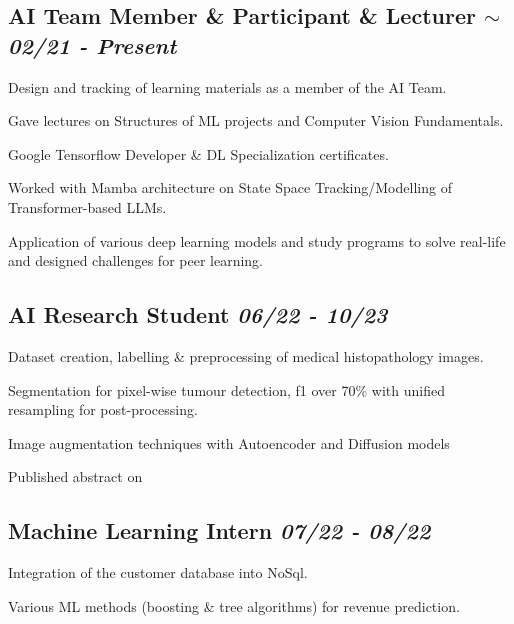\documentclass[letter, 14pt]{article}
\begin{document}
\subsection{AI Team Member \& Participant \& Lecturer \hfill\textit{\textmd{{\tiny$\sim$} 02/21 - Present}}}
\begin{zitemize}
\item Design and tracking of learning materials as a member of the AI Team.
\item Gave lectures on Structures of ML projects and Computer Vision Fundamentals.
\item Google Tensorflow Developer \& DL Specialization certificates.
\item Worked with Mamba architecture on State Space Tracking/Modelling of Transformer-based LLMs.
\item Application of various deep learning models and study programs to solve real-life and designed challenges for peer learning.
\end{zitemize}


\subsection{AI Research Student \hfill \textit{\textmd{ 06/22 - 10/23}}}
\begin{zitemize}
\item Dataset creation, labelling \& preprocessing of medical histopathology images.
\item Segmentation for pixel-wise tumour detection, f1 over 70\% with unified resampling for post-processing.
\item Image augmentation techniques with Autoencoder and Diffusion models
\item Published abstract on 
\href{https://arxiv.org/abs/2504.05219}{\color{black}{arxiv. \externallink}}
\end{zitemize}


\subsection{Machine Learning Intern \hfill \textit{\textmd{ 07/22 - 08/22}}}
\begin{zitemize}
\item Integration of the customer database into NoSql.
\item Various ML methods (boosting \& tree algorithms) for revenue prediction.
\end{zitemize}
\end{document}
